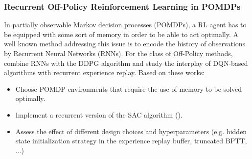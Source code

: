 \documentclass[a4paper]{article}
\begin{document}
\subsubsection{Recurrent Off-Policy Reinforcement Learning in POMDPs}
In partially observable Markov decision processes (POMDPs), a RL agent has to be equipped with some sort of memory in order to be able to act optimally. A well known method addressing this issue is to encode the history of observations by Recurrent Neural Networks (RNNs).
For the class of Off-Policy methods, \cite{heess2015memory} combine RNNs with the DDPG algorithm and \cite{kapturowski2018recurrent} study the interplay of DQN-based algorithms with recurrent experience replay.
Based on these works:
\begin{itemize}
  \item Choose POMDP environments that require the use of memory to be solved optimally.
  \item Implement a recurrent version of the SAC algorithm (\cite{Haarnoja2018a}).
  \item Assess the effect of different design choices and hyperparameters (e.g. hidden state initialization strategy in the experience replay buffer, truncated BPTT, ...)
\end{itemize}

\end{document}
